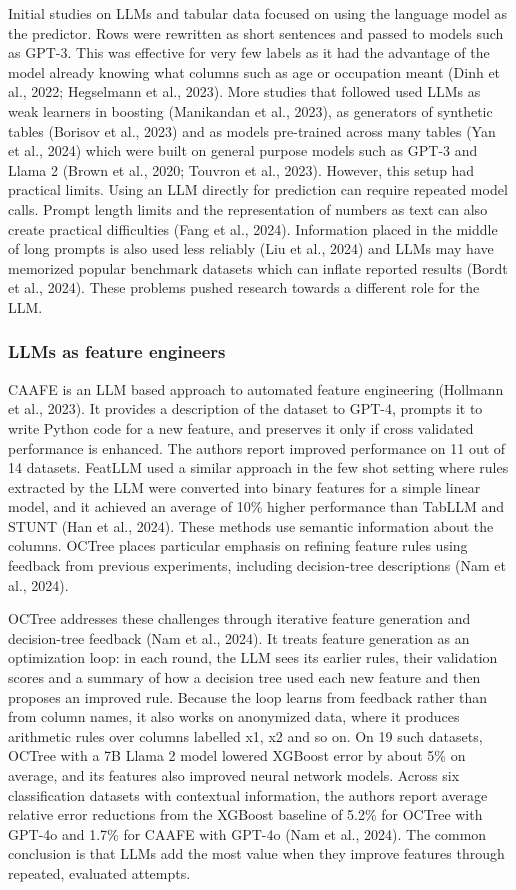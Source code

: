 \documentclass[11pt]{article}
\begin{document}
Initial studies on LLMs and tabular data focused on using the language model as the predictor. Rows
were rewritten as short sentences and passed to models such as GPT-3. This was effective for very
few labels as it had the advantage of the model already knowing what columns such as age or
occupation meant (Dinh et al., 2022; Hegselmann et al., 2023). More studies that followed used LLMs
as weak learners in boosting (Manikandan et al., 2023), as generators of synthetic tables (Borisov
et al., 2023) and as models pre-trained across many tables (Yan et al., 2024) which were built on
general purpose models such as GPT-3 and Llama 2 (Brown et al., 2020; Touvron et al., 2023).
However, this setup had practical limits. Using an LLM directly for prediction can require repeated
model calls. Prompt length limits and the representation of numbers as text can also create
practical difficulties (Fang et al., 2024). Information placed in the middle of long prompts is also
used less reliably (Liu et al., 2024) and LLMs may have memorized popular benchmark datasets which
can inflate reported results (Bordt et al., 2024). These problems pushed research towards a
different role for the LLM.

\subsubsection{LLMs as feature engineers}

CAAFE is an LLM based approach to automated feature engineering (Hollmann et al., 2023). It provides
a description of the dataset to GPT-4, prompts it to write Python code for a new feature, and
preserves it only if cross validated performance is enhanced. The authors report improved
performance on 11 out of 14 datasets. FeatLLM used a similar approach in the few
shot setting where rules extracted by the LLM were converted into binary features for a simple
linear model, and it achieved an average of 10\% higher performance than TabLLM and STUNT (Han et
al., 2024). These methods use semantic information about the columns. OCTree places particular
emphasis on refining feature rules using feedback from previous experiments, including
decision-tree descriptions (Nam et al., 2024).

OCTree addresses these challenges through iterative feature generation and decision-tree feedback
(Nam et al., 2024). It treats feature generation as an optimization loop: in each round, the LLM
sees its earlier rules, their validation scores and a summary of how a decision tree used each new
feature and then proposes an improved rule. Because the loop learns from feedback rather than from
column names, it also works on anonymized data, where it produces arithmetic rules over columns
labelled x1, x2 and so on. On 19 such datasets, OCTree with a 7B Llama 2 model lowered XGBoost error
by about 5\% on average, and its features also improved neural network models. Across six
classification datasets with contextual information, the authors report average relative error
reductions from the XGBoost baseline of 5.2\% for OCTree with GPT-4o and 1.7\% for CAAFE with GPT-4o
(Nam et al., 2024). The common conclusion is that LLMs add the most value when they improve features
through repeated, evaluated attempts.
\end{document}

